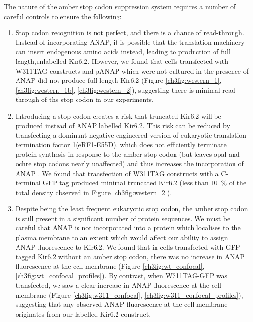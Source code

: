The nature of the amber stop codon suppression system requires a number of careful controls to ensure the following:

\begin{enumerate}
	\item Stop codon recognition is not perfect, and there is a chance of read-through.
	Instead of incorporating ANAP, it is possible that the translation machinery can insert endogenous amino acids instead, leading to production of full length,unlabelled Kir6.2.
	However, we found that cells transfected with W311TAG constructs and pANAP which were not cultured in the presence of ANAP did not produce full length Kir6.2 (Figure \ref{ch3fig:western_1}, \ref{ch3fig:western_1b}, \ref{ch3fig:western_2}), suggesting there is minimal read-through of the stop codon in our experiments.
	\item Introducing a stop codon creates a risk that truncated Kir6.2 will be produced instead of ANAP labelled Kir6.2.
	This risk can be reduced by transfecting a dominant negative engineered version of eukaryotic translation termination factor 1(eRF1-E55D), which does not efficiently terminate protein synthesis in response to the amber stop codon (but leaves opal and ochre stop codons nearly unaffected) and thus increases the incorporation of ANAP \cite{schmied_efficient_2014}.
	We found that transfection of W311TAG constructs with a C-terminal GFP tag produced minimal truncated Kir6.2 (less than \SI{10}{\percent} of the total density observed in Figure \ref{ch3fig:western_2}).
	\item Despite being the least frequent eukaryotic stop codon, the amber stop codon is still present in a significant number of protein sequences.
	We must be careful that ANAP is not incorporated into a protein which localises to the plasma membrane to an extent which would affect our ability to assign ANAP fluorescence to Kir6.2.
	We found that in cells transfected with GFP-tagged Kir6.2 without an amber stop codon, there was no increase in ANAP fluorescence at the cell membrane (Figure \ref{ch3fig:wt_confocal}, \ref{ch3fig:wt_confocal_profiles}).
	By contrast, when W311TAG-GFP was transfected, we saw a clear increase in ANAP fluorescence at the cell membrane (Figure \ref{ch3fig:w311_confocal}, \ref{ch3fig:w311_confocal_profiles}), suggesting that any observed ANAP fluorescence at the cell membrane originates from our labelled Kir6.2 construct.
\end{enumerate}

